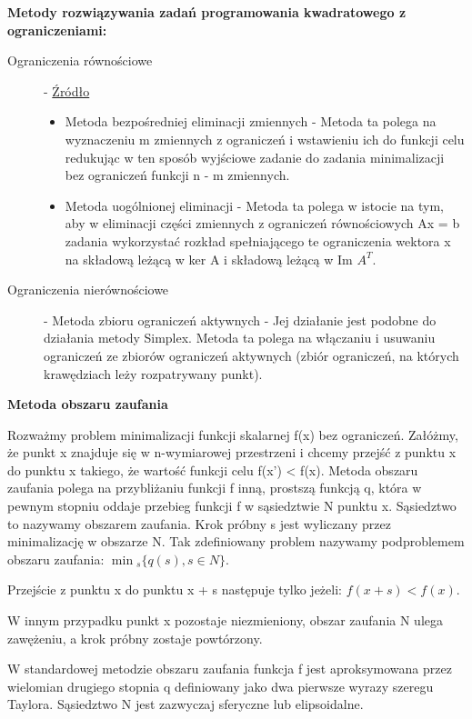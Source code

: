 \textbf{Metody rozwiązywania zadań programowania kwadratowego z ograniczeniami:}
\begin{description}
    \item[Ograniczenia równościowe] - \href{http://staff.uz.zgora.pl/acegiels/met-opt2020-r4.pdf}{Źródło}\mbox{}
    \begin{itemize}
        \item Metoda bezpośredniej eliminacji zmiennych - Metoda ta polega na wyznaczeniu m zmiennych z ograniczeń i wstawieniu ich do funkcji celu redukując w ten sposób wyjściowe zadanie do zadania minimalizacji bez ograniczeń funkcji n - m zmiennych.
        \item Metoda uogólnionej eliminacji - Metoda ta polega w istocie na tym, aby w eliminacji części zmiennych z ograniczeń równościowych Ax = b zadania wykorzystać rozkład spełniającego te ograniczenia wektora x na składową leżącą w ker A i składową leżącą w Im $A^T$.
    \end{itemize}
    \item[Ograniczenia nierównościowe] - Metoda zbioru ograniczeń aktywnych - Jej działanie jest podobne do działania metody Simplex. Metoda ta polega na włączaniu i usuwaniu ograniczeń ze zbiorów ograniczeń aktywnych (zbiór ograniczeń, na których krawędziach leży rozpatrywany punkt).
\end{description}

\textbf{Metoda obszaru zaufania}

Rozważmy problem minimalizacji funkcji skalarnej f(x) bez ograniczeń. Załóżmy, że punkt x znajduje się w n-wymiarowej przestrzeni i chcemy przejść z punktu x do punktu x takiego, że wartość funkcji celu f(x') < f(x). Metoda obszaru zaufania polega na przybliżaniu funkcji f inną, prostszą funkcją q, która w pewnym stopniu oddaje przebieg funkcji f w sąsiedztwie N punktu x. Sąsiedztwo to nazywamy obszarem zaufania. Krok próbny s jest wyliczany przez minimalizację w obszarze N. Tak zdefiniowany problem nazywamy podproblemem obszaru zaufania: $\min{}_s\{q(s),s\in N\}$.

Przejście z punktu x do punktu x + s następuje tylko jeżeli: $f(x+s) < f(x)$.

W innym przypadku punkt x pozostaje niezmieniony, obszar zaufania N ulega zawężeniu, a krok próbny zostaje powtórzony. 

W standardowej metodzie obszaru zaufania funkcja f jest aproksymowana przez wielomian drugiego stopnia q definiowany jako dwa pierwsze wyrazy szeregu Taylora. Sąsiedztwo N jest zazwyczaj sferyczne lub elipsoidalne.

